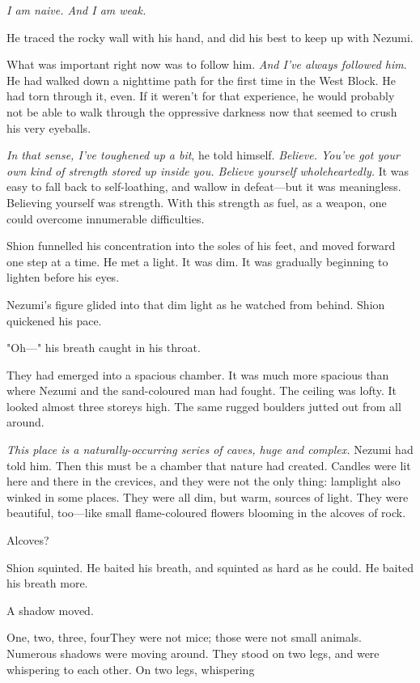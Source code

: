 \emph{I am naive. And I am weak.}

He traced the rocky wall with his hand, and did his best to keep up with
Nezumi.

What was important right now was to follow him. \emph{And I've always followed
him}. He had walked down a nighttime path for the first time in the West
Block. He had torn through it, even. If it weren't for that experience,
he would probably not be able to walk through the oppressive darkness
now that seemed to crush his very eyeballs.

\emph{In that sense, I've toughened up a bit}, he told himself. \emph{Believe. You've
got your own kind of strength stored up inside you. Believe yourself
wholeheartedly.} It was easy to fall back to self-loathing, and wallow in
defeat---but it was meaningless. Believing yourself was strength. With
this strength as fuel, as a weapon, one could overcome innumerable
difficulties.

Shion funnelled his concentration into the soles of his feet, and moved
forward one step at a time. He met a light. It was dim. It was gradually
beginning to lighten before his eyes.

Nezumi's figure glided into that dim light as he watched from behind.
Shion quickened his pace.

"Oh---" his breath caught in his throat.

They had emerged into a spacious chamber. It was much more spacious than
where Nezumi and the sand-coloured man had fought. The ceiling was
lofty. It looked almost three storeys high. The same rugged boulders
jutted out from all around.

\emph{This place is a naturally-occurring series of caves, huge and complex.}
Nezumi had told him. Then this must be a chamber that nature had
created. Candles were lit here and there in the crevices, and they were
not the only thing: lamplight also winked in some places. They were all
dim, but warm, sources of light. They were beautiful, too---like small
flame-coloured flowers blooming in the alcoves of rock.

Alcoves?

Shion squinted. He baited his breath, and squinted as hard as he could.
He baited his breath more.

A shadow moved.

One, two, three, four\el They were not mice; those were not small
animals. Numerous shadows were moving around. They stood on two legs,
and were whispering to each other. On two legs, whispering\el 

